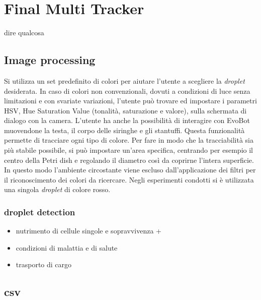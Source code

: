 \chapter{Final Multi Tracker}
\vspace{0.5cm}
\label{cha:789}

dire qualcosa


\section{Image processing}
\label{sec:456}
Si utilizza un set predefinito di colori per aiutare l'utente a scegliere la \emph{droplet} desiderata. In caso di colori non convenzionali, dovuti a condizioni di luce senza limitazioni e con svariate variazioni, l'utente può trovare ed impostare i parametri HSV, Hue Saturation Value (tonalità, saturazione e valore), sulla schermata di dialogo con la camera. L'utente ha anche la possibilità di interagire con EvoBot muovendone la testa, il corpo delle siringhe e gli stantuffi.
Questa funzionalità permette di tracciare ogni tipo di colore. Per fare in modo che la tracciabilità sia più stabile possibile, si può impostare un'area specifica, centrando per esempio il centro della Petri dish e regolando il diametro così da coprirne l'intera superficie. In questo modo l'ambiente circostante viene escluso dall'applicazione dei filtri per il riconoscimento dei colori da ricercare. 
Negli esperimenti condotti si è utilizzata una singola  \emph{droplet} di colore rosso. 




\subsection{droplet detection}
\label{sec:00456}
\begin {itemize}
	\item nutrimento di cellule singole e sopravvivenza + 
	\item condizioni di malattia e di salute
	\item trasporto di cargo
\end{itemize}

\section{csv}
\label{sec:123}



